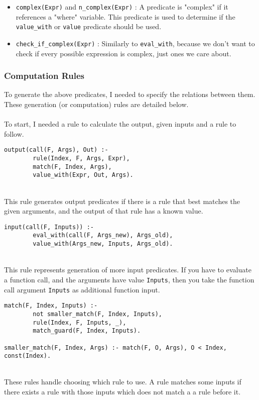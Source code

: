 \begin{itemize}
\item \lstinline{complex(Expr)} and \lstinline{n_complex(Expr)} : A predicate is "complex" if it references a "where" variable. This predicate is used to determine if the \lstinline{value_with} or \lstinline{value} predicate should be used.
\item \lstinline{check_if_complex(Expr)} : Similarly to \lstinline{eval_with}, because we don't want to check if every possible expression is complex, just ones we care about.
\end{itemize}


\subsubsection{Computation Rules}
To generate the above predicates, I needed to specify the relations between them. These generation (or computation) rules are detailed below. \\ \\
To start, I needed a rule to calculate the output, given inputs and a rule to follow. \\

\begin{lstlisting}
output(call(F, Args), Out) :- 
    	rule(Index, F, Args, Expr), 
    	match(F, Index, Args), 
    	value_with(Expr, Out, Args).
\end{lstlisting}
\mbox{} \\
This rule generates output predicates if there is a rule that best matches the given arguments, and the output of that rule has a known value. \\

\begin{lstlisting}
input(call(F, Inputs)) :- 
		eval_with(call(F, Args_new), Args_old), 
		value_with(Args_new, Inputs, Args_old).
\end{lstlisting}
\mbox{} \\
This rule represents generation of more input predicates. If you have to evaluate a function call, and the arguments have value \lstinline{Inputs}, then you take the function call argument \lstinline{Inputs} as additional function input. \\

\begin{lstlisting}
match(F, Index, Inputs) :- 
		not smaller_match(F, Index, Inputs), 
		rule(Index, F, Inputs, _), 
		match_guard(F, Index, Inputs).
		
smaller_match(F, Index, Args) :- match(F, O, Args), O < Index, const(Index).
\end{lstlisting}
\mbox{} \\
These rules handle choosing which rule to use. A rule matches some inputs if there exists a rule with those inputs which does not match a a rule before it. \\

